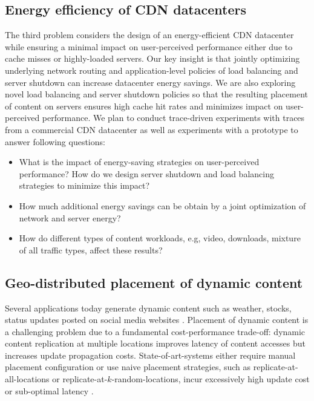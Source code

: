 \subsection{Energy efficiency of CDN datacenters}
\label{sec:intro-shrink}
The third problem considers the design of an energy-efficient CDN datacenter while ensuring a minimal impact on user-perceived performance either due to cache misses or highly-loaded servers.
Our key insight is that jointly optimizing underlying network routing and application-level policies of load balancing and server shutdown can increase datacenter energy savings.
We are also exploring novel load balancing and server shutdown policies so that the resulting placement of content on servers ensures high cache hit rates and minimizes impact on user-perceived performance.  We plan to conduct trace-driven experiments with traces from a commercial CDN datacenter as well as experiments with a prototype to answer following questions:
\begin{itemize}
\item
What is the impact of energy-saving strategies on user-perceived performance? How do we design server shutdown and load balancing strategies to minimize this impact?
\item
How much additional energy savings can be obtain by a joint optimization of network and server energy?
\item
How do different types of content workloads, e.g, video, downloads, mixture of all traffic types, affect these results?
\end{itemize}

\subsection{Geo-distributed placement of dynamic content}
\label{sec:intro-auspice}

Several applications today generate dynamic content such as weather, stocks, status updates posted on social media websites \cite{volley, twitter}.
Placement of dynamic content is a challenging problem due to a fundamental cost-performance trade-off: dynamic content replication at multiple locations improves latency of content accesses but increases update propagation costs. 
State-of-art-systems either require manual placement configuration or use naive placement strategies, such as replicate-at-all-locations or   replicate-at-$k$-random-locations, incur excessively high update cost or sub-optimal latency \cite{spanner,beehive}. 

